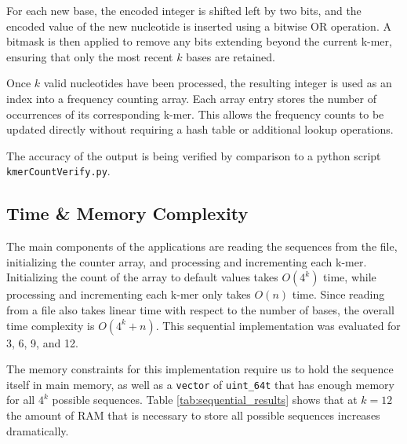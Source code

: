 \documentclass{article}
\begin{document}
For each new base, the encoded integer is shifted left by two bits, and the encoded value of the new
nucleotide is inserted using a bitwise OR operation. A bitmask is then applied to remove any bits extending
beyond the current k-mer, ensuring that only the most recent $k$ bases are retained.

Once $k$ valid nucleotides have been processed, the resulting integer is used as an index into a frequency
counting array. Each array entry stores the number of occurrences of its corresponding k-mer. This allows
the frequency counts to be updated directly without requiring a hash table or additional lookup operations.

The accuracy of the output is being verified by comparison to a python script \texttt{kmerCountVerify.py}. 

\newpage

\subsection{Time \& Memory Complexity}

\vspace{\baselineskip}

The main components of the applications are reading the sequences from the file, initializing the counter array, and processing and incrementing each k-mer. 
Initializing the count of the array to default values takes $O(4^k)$ time, while processing and incrementing each k-mer only takes $O(n)$ time. Since reading 
from a file also takes linear time with respect to the number of bases, the overall time complexity is $O(4^k + n)$. This sequential implementation was 
evaluated for 3, 6, 9, and 12.

\vspace{\baselineskip}

The memory constraints for this implementation require us to hold the sequence itself in main memory, as well as a \texttt{vector} of \texttt{uint\_64t} 
that has enough memory for all $4^k$ possible sequences. Table \ref{tab:sequential_results} shows that at $k=12$ the amount of RAM that is necessary to store 
all possible sequences increases dramatically.

\vspace{\baselineskip}

\FloatBarrier

\FloatBarrier

\vspace{\baselineskip}
\end{document}
